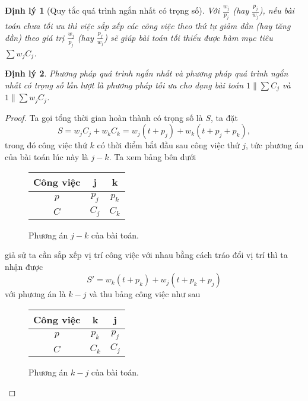 \documentclass[12pt,a4paper]{report}
\newtheorem{dl}{Định lý}
\begin{document}
\begin{dl}[Quy tắc quá trình ngắn nhất có trọng số]
Với $\frac{w_j}{p_j}$ (hay $\frac{p_j}{w_j}$), nếu bài toán chưa tối ưu thì việc sắp xếp các công việc theo thứ tự giảm dần (hay tăng dần) theo giá trị $\frac{w_j}{p_j}$ (hay $\frac{p_j}{w_j}$) sẽ giúp bài toán tối thiểu được hàm mục tiêu $\sum w_j C_j$.
\end{dl}

\begin{dl}
	Phương pháp quá trình ngắn nhất và phương pháp quá trình ngắn nhất có trọng số lần lượt là phương pháp tối ưu cho dạng bài toán $1 \| \sum C_j$ và $1 \| \sum w_j C_j$.
\end{dl}

\begin{proof}
	Ta gọi tổng thời gian hoàn thành có trọng số là $S$, ta đặt
	\begin{equation} \label{S}
		S = w_j C_j + w_k C_k = w_j(t+p_j) + w_k(t+p_j+p_k),
	\end{equation}
	trong đó công việc thứ $k$ có thời điểm bắt đầu sau công việc thứ $j$, tức phương án của bài toán lúc này là $j - k$. Ta xem bảng bên dưới
	
	\begin{figure}[h!]
		\centering
		 \begin{tabular}{|c | c c |} 
		 \hline
		 Công việc & j & k \\
		 \hline\hline
		 $p$ & $p_j$ & $p_k$ \\
		 $C$ & $C_j$ & $C_k$ \\
		 \hline
		 \end{tabular}
	\caption{Phương án $j - k$ của bài toán.}
	\end{figure}
	
	giả sử ta cần sắp xếp vị trí công việc với nhau bằng cách tráo đổi vị trí thì ta nhận được
	\begin{equation} \label{S'}
		S' = w_k(t+p_k) + w_j(t+p_k+p_j)
	\end{equation}
	với phương án là $k-j$ và thu bảng công việc như sau
	
	\begin{figure}[h!]
		\centering
		 \begin{tabular}{|c | c c |} 
		 \hline
		 Công việc & k & j \\
		 \hline\hline
		 $p$ & $p_k$ & $p_j$ \\
		 $C$ & $C_k$ & $C_j$ \\
		 \hline
		 \end{tabular}
	\caption{Phương án $k - j$ của bài toán.}
	\end{figure}


\end{proof}
\end{document}
